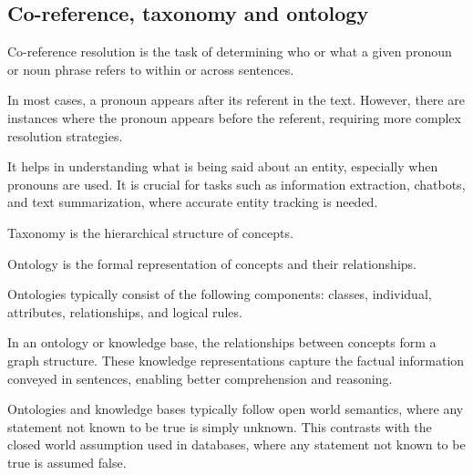 \subsection{Co-reference, taxonomy and ontology}
\begin{definition}
    Co-reference resolution is the task of determining who or what a given pronoun or noun phrase refers to within or across sentences.
\end{definition}
\noindent In most cases, a pronoun appears after its referent in the text.
However, there are instances where the pronoun appears before the referent, requiring more complex resolution strategies.

It helps in understanding what is being said about an entity, especially when pronouns are used.
It is crucial for tasks such as information extraction, chatbots, and text summarization, where accurate entity tracking is needed.

\begin{definition}
    Taxonomy is the hierarchical structure of concepts. 
\end{definition}
\begin{definition}
    Ontology is the formal representation of concepts and their relationships.
\end{definition}
Ontologies typically consist of the following components: classes, individual, attributes, relationships, and logical rules. 

In an ontology or knowledge base, the relationships between concepts form a graph structure. 
These knowledge representations capture the factual information conveyed in sentences, enabling better comprehension and reasoning.

Ontologies and knowledge bases typically follow open world semantics, where any statement not known to be true is simply unknown. 
This contrasts with the closed world assumption used in databases, where any statement not known to be true is assumed false.